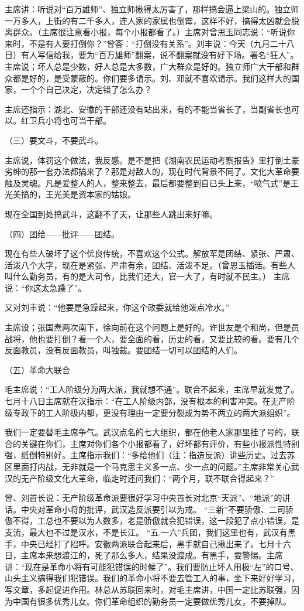 {主席讲：听说对“百万雄师”、独立师揪得太厉害了，那样搞会逼上梁山的。独立师一万多人，上街的有二千多人，连人家的家属也倒霉，这样不好，搞得太凶就会脱离群众。（主席很注意看小报，每个小报都看了。）主席对曾思玉同志说：“听说你来时，不是有人要打倒你？”曾答：“打倒没有关系”。刘丰说：今天（九月二十八日）有人写信给我，要为“百万雄师”翻案，说不翻案就没有好下场。署名“狂人”。主席说；坏人总是少数，好人总是大多数，广大群众是好的。独立师广大干部和群众都是好的，是受蒙蔽的。你们要多请示。刘、邓就不喜欢请示。我们这样大的国家，一个个自己决定，决定错了怎么办？

主席还指示：湖北、安徽的干部还没有站出来，有的不能当省长了，当副省长也可以。红卫兵小将也可当干部。

（三）要文斗，不要武斗。

主席说，体罚这个做法，我反感。是不是把《湖南农民运动考察报告》里打倒土豪劣绅的那一套办法都搞来了？那是对敌人的，现在时代背景不同了。文化大革命要触及灵魂。凡是爱整人的人，整来整去，最后都要整到自已头上来，“喷气式”是王光美搞的，王光美是资本家的姑娘。

现在全国到处搞武斗，这翻不了天，让那些人跳出来好嘛。

（四）团给——批评——团结。

现在有些人破坏了这个优良传统，不喜欢这个公式。解放军是团结、紧张、严肃、活泼八个大字，现在是紧张、严肃有余，团结、活泼不足。（曾思玉插话。有些人叫什么勤务员，有的是大司令，比我们还大，官一大了，有时就不民主。） 主席说：“你这太急躁了”。

又对刘丰说：“他要是急躁起来，你这个政委就给他泼点冷水。”

主席设；张国焘两次南下，徐向前在这个问题上是好的。许世友是个和尚，但是员战将，他也要打倒？看一个人，要全面的看，历史的看，又要比较的看。要有几个反面教员，没有反面教员，叫独裁。要团结一切可以团结的人们。

（五）革命大联合

毛主席说：“工人阶级分为两大派，我就想不通”。联合不起来，主席早就发觉了。七月十八日主席就在汉指示：“在工人阶级内部，没有根本的利害冲突。在无产阶级专政下的工人阶级内都，更没有理由一定要分裂成为势不两立的两大派组织”。

我们一定要替毛主席争气。武汉点名的七大组织，都在他老人家那里挂了号的，联合的关键在你们，主席对你们各个小报都看了，好坏都有评价，有些小报派性特别强，纸倒特别好。主席指示我们：“多给他们（注：指造反派）讲些历史。过去苏区里面打内战，无非就是一个马克思主义多一点、少一点的问题。”主席非常关心武汉的无产阶级文化大革命，临走时还问我们：“两个月，联不联合得起来？”

曾、刘首长说：无产阶级革命派要很好学习中央首长对北京“天派”、“地派”的讲话。中央对革命小将的批评，武汉造反派要引以为戒。  “三新”不要骄傲、二司骄傲不得，工总也不要以为人数多，老是骄傲就会犯错误，这一段犯了点小错误，是支流，最大也不过是汉水，不是长江。 “五.一六”兵团，我们这里也有，武汉有黑手，中央已经打了招呼。安徽两派联合起来后，黑手就自己揪出来了。七月十六日，主席本来想渡江的，死了那么多人，结果没渡成。有黑手，要警惕。主席讲：“现在是革命小将有可能犯错误的时候了”。我们要防止坏人用极“左”的口号、山头主义搞得我们犯错误。我们的革命小将不要去管工人的事，坐下来好好学习，写文章，多起促进作用。林总从苏联回来时，对毛主席讲，中国一定比苏联强，因为中国有很多优秀儿女。你们革命组织的勤务员一定要做优秀儿女，不要掉队。

}
